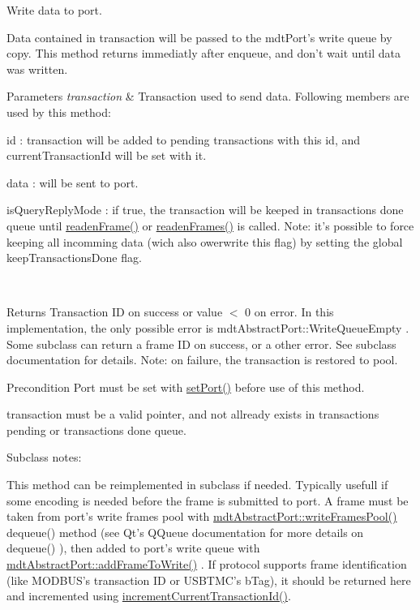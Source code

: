 Write data to port. 

Data contained in transaction will be passed to the mdtPort's write queue by copy. This method returns immediatly after enqueue, and don't wait until data was written.


\begin{DoxyParams}{Parameters}
{\em transaction} & Transaction used to send data. Following members are used by this method:
\begin{DoxyItemize}
\item id : transaction will be added to pending transactions with this id, and currentTransactionId will be set with it.
\item data : will be sent to port.
\item isQueryReplyMode : if true, the transaction will be keeped in transactions done queue until \hyperlink{classmdt_port_manager_a830ae182d06dd6a52c43a7f45b9240ac}{readenFrame()} or \hyperlink{classmdt_port_manager_addd5dcae9644cea42a9871205af41796}{readenFrames()} is called. Note: it's possible to force keeping all incomming data (wich also owerwrite this flag) by setting the global keepTransactionsDone flag. 
\end{DoxyItemize}\\
\hline
\end{DoxyParams}
\begin{DoxyReturn}{Returns}
Transaction ID on success or value $<$ 0 on error. In this implementation, the only possible error is mdtAbstractPort::WriteQueueEmpty . Some subclass can return a frame ID on success, or a other error. See subclass documentation for details. Note: on failure, the transaction is restored to pool. 
\end{DoxyReturn}
\begin{DoxyPrecond}{Precondition}
Port must be set with \hyperlink{classmdt_port_manager_afcd156b2d0c9d340999935efb6cd8cb6}{setPort()} before use of this method. 

transaction must be a valid pointer, and not allready exists in transactions pending or transactions done queue.
\end{DoxyPrecond}
Subclass notes:\par
 This method can be reimplemented in subclass if needed. Typically usefull if some encoding is needed before the frame is submitted to port. A frame must be taken from port's write frames pool with \hyperlink{classmdt_abstract_port_abf093b67fddebffa4f3c52277b9a8cf7}{mdtAbstractPort::writeFramesPool()} dequeue() method (see Qt's QQueue documentation for more details on dequeue() ), then added to port's write queue with \hyperlink{classmdt_abstract_port_a9a69eb2fc07d551ab37c011487fa319d}{mdtAbstractPort::addFrameToWrite()} . If protocol supports frame identification (like MODBUS's transaction ID or USBTMC's bTag), it should be returned here and incremented using \hyperlink{classmdt_port_manager_a4d009936a0a5130f3bfecb69fee4ce42}{incrementCurrentTransactionId()}. 


